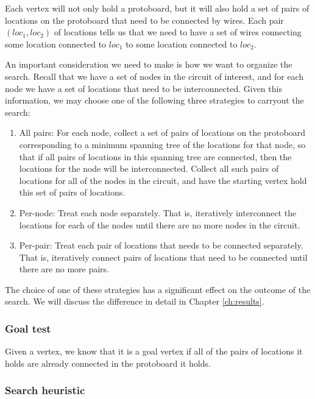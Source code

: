 Each vertex will not only hold a protoboard, but it will also hold a set of
pairs of locations on the protoboard that need to be connected by wires. Each
pair $(loc_1, loc_2)$ of locations tells us that we need to have a set of wires
connecting some location connected to $loc_1$ to some location connected to
$loc_2$.

An important consideration we need to make is how we want to organize the
search. Recall that we have a set of nodes in the circuit of interest, and for
each node we have a set of locations that need to be interconnected. Given this
information, we may choose one of the following three strategies to carryout the
search:

\begin{enumerate}
\item All pairs: For each node, collect a set of pairs of locations on the
protoboard
corresponding to a minimum spanning tree of the locations for that node, so that
if all pairs of locations in this spanning tree are connected, then the
locations for the node will be interconnected. Collect all such pairs of
locations for all of the nodes in the circuit, and have the starting vertex hold
this set of pairs of locations.
\item Per-node: Treat each node separately. That is, iteratively interconnect the
locations for each of the nodes until there are no more nodes in the circuit.
\item Per-pair: Treat each pair of locations that needs to be connected
separately. That
is, iteratively connect pairs of locations that need to be connected until there
are no more pairs.
\end{enumerate}

The choice of one of these strategies has a significant effect on the outcome of
the search. We will discuss the difference in detail in Chapter
\ref{ch:results}.

\subsubsection{Goal test}

Given a vertex, we know that it is a goal vertex if all of the pairs of
locations it holds are already connected in the protoboard it holds.

\subsubsection{Search heuristic}

